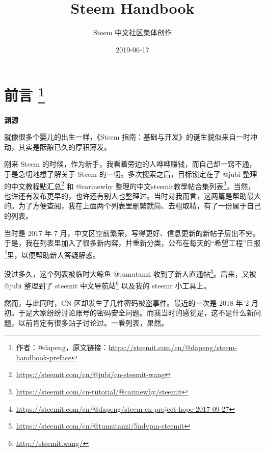 \documentclass[]{ctexbook}
\title{Steem Handbook}
\author{Steem 中文社区集体创作}
\date{2019-06-17}
\renewcommand{\href}[2]{#2\footnote{\url{#1}}}
\begin{document}

\begin{titlepage}

\end{titlepage}

\setlength{\abovedisplayskip}{-5pt}
\setlength{\abovedisplayshortskip}{-5pt}

{
\setcounter{tocdepth}{1}
\tableofcontents
}


\hypertarget{index}{%
\chapter*{\texorpdfstring{前言 \footnote{作者：@dapeng，原文链接：\url{https://steemit.com/cn/@dapeng/steem-handbook-preface}}}{前言 }}\label{index}}

\textbf{渊源}

就像很多个婴儿的出生一样，《Steem 指南：基础与开发》的诞生貌似来自一时冲动，其实是酝酿已久的厚积薄发。

刚来 Steem 的时候，作为新手，我看着旁边的人哗哗赚钱，而自己却一窍不通，于是急切地想了解关于 Steem 的一切。多次搜索之后，目标锁定在了 @jubi 整理的\href{https://steemit.com/cn/@jubi/cn-steemit-wang}{中文教程贴汇总} 和 @carinewhy 整理的\href{https://steemit.com/cn-tutorial/@carinewhy/steemit}{中文steemit教學帖合集列表}。当然，也许还有发布更早的，也许还有别人也整理过。当时对我而言，这两篇是帮助最大的。为了方便查阅，我在上面两个列表里删繁就简、去粗取精，有了一份属于自己的列表。

当时是 2017 年 7 月，中文区空前繁荣，写得更好、信息更新的新帖子层出不穷。于是，我在列表里加入了很多新内容，并重新分类，公布在每天的\href{https://steemit.com/cn/@dapeng/steem-cn-project-hope-2017-09-27}{``希望工程''日报}里，以便帮助新人答疑解惑。

没过多久，这个列表被临时大鲸鱼 @tumutanzi 收到了\href{https://steemit.com/cn/@tumutanzi/5ndvpm-steemit}{新人直通帖}。后来，又被 @jubi 整理到了 \href{http://steemit.wang/}{steemit 中文导航站} 以及我的 steemr 小工具上。

然而，与此同时，CN 区却发生了几件密码被盗事件。最近的一次是 2018 年 2 月初。于是大家纷纷讨论账号的密码安全问题。而我当时的感觉是，这不是什么新问题，以前肯定有很多贴子讨论过。一看列表，果然。
\end{document}
